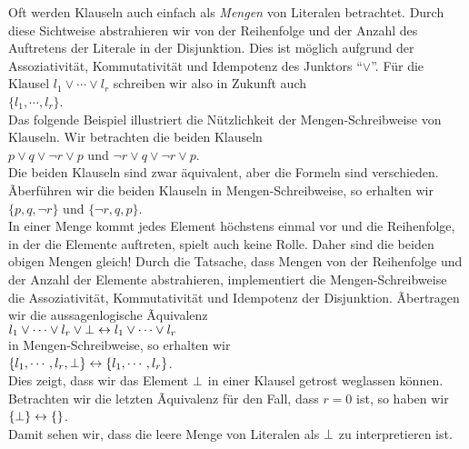 Oft werden Klauseln auch einfach als \emph{Mengen} von Literalen betrachtet.  
Durch diese Sichtweise abstrahieren wir von der Reihenfolge und der Anzahl des Auftretens
der Literale in der Disjunktion.  Dies ist m\"{o}glich aufgrund der Assoziativit\"{a}t, Kommutativit\"{a}t und
Idempotenz des Junktors ``$\vee$''.  F\"{u}r die Klausel $l_1 \vee \cdots \vee l_r$ schreiben
wir also in Zukunft auch 
\\[0.2cm]
\hspace*{1.3cm} $\{ l_1, \cdots, l_r \}$.
\\[0.2cm]
Das folgende Beispiel illustriert die N\"{u}tzlichkeit der Mengen-Schreibweise von Klauseln.
Wir betrachten die beiden Klauseln
\\[0.2cm]
\hspace*{1.3cm}
$p \vee q \vee \neg r \vee p$ \quad und \quad $\neg r \vee q \vee \neg r \vee p$. 
\\[0.2cm]
Die beiden Klauseln sind zwar \"{a}quivalent, aber die Formeln sind verschieden.
Ãberf\"{u}hren wir die beiden Klauseln in Mengen-Schreibweise, so erhalten wir
\\[0.2cm]
\hspace*{1.3cm}
$\{p, q, \neg r \}$ \quad und \quad $\{ \neg r, q, p \}$. 
\\[0.2cm]
In einer Menge kommt jedes Element h\"{o}chstens einmal vor und die Reihenfolge, in der die
Elemente auftreten, spielt auch keine Rolle.  Daher sind die beiden obigen Mengen gleich!
Durch die Tatsache, dass Mengen von der Reihenfolge und der Anzahl der Elemente
abstrahieren, implementiert die Mengen-Schreibweise die Assoziativit\"{a}t, Kommutativit\"{a}t und
Idempotenz der Disjunktion.  Ãber\-tragen wir die  aussagenlogische Ãquivalenz
\\[0.2cm]
\hspace*{1.3cm}
$l_1 \vee \cdots \vee l_r \vee \bot \leftrightarrow l_1 \vee \cdots \vee l_r$
\\[0.2cm]
in Mengen-Schreibweise, so erhalten wir
\\[0.2cm]
\hspace*{1.3cm}
$\{ l_1, \cdots, l_r, \bot \} \leftrightarrow \{ l_1, \cdots, l_r \}$.
\\[0.2cm]
Dies zeigt, dass wir das Element $\bot$ in einer Klausel getrost weglassen k\"{o}nnen.
Betrachten wir die letzten Ãquivalenz f\"{u}r den Fall, dass $r=0$ ist, so haben wir
\\[0.2cm]
\hspace*{1.3cm}
$\{\bot \} \leftrightarrow \{\}$.
\\[0.2cm]
Damit sehen wir, dass die leere Menge von Literalen als $\bot$ zu interpretieren ist.

